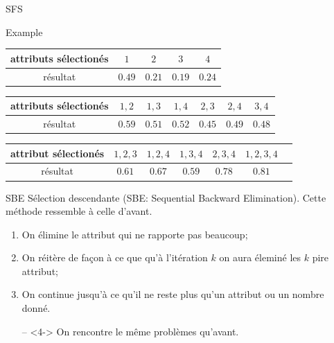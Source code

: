 \documentclass[9pt]{beamer}
\begin{document}
	\begin{frame}{SFS}
		\begin{block}{Example}
			\begin{longtable}{c c c c c}
				\toprule
				attributs sélectionés & $1$ & $2$ & $3$ & $4$\\
				\midrule
				résultat& $0.49$ & $0.21$ & $0.19$ &$0.24$\\
				\bottomrule
			\end{longtable}
			\begin{longtable}{c c c c c c c}
				\toprule
				attributs sélectionés & $1,2$ & $1,3$ & $1,4$ & $2,3$ & $2,4$ & $3,4$\\
				\midrule
				résultat & $0.59$ & $0.51$ & $0.52$ & $0.45$ & $0.49$ & $0.48$\\
				\bottomrule
			\end{longtable}
			\begin{longtable}{c c c c c c c}
				\toprule
				attribut sélectionés & $1,2,3$ & $1,2,4$ & $1,3,4$ & $2,3,4$ & $1,2,3,4$\\
				\midrule
				résultat & $0.61$ & $0.67$ & $0.59$ & $0.78$ & $0.81$\\
				\bottomrule
			\end{longtable}
		\end{block}
	\end{frame}

	\begin{frame}{SBE}
		Sélection descendante (SBE\@: Sequential Backward Elimination).
		Cette méthode ressemble à celle d'avant.
		\begin{enumerate}
		\item<1-> On élimine le attribut qui ne rapporte pas beaucoup;
		\item<2-> On réitère de façon à ce que qu'à l'itération $k$ on aura éleminé les $k$ pire attribut;
		\item<3-> On continue jusqu'à ce qu'il ne reste plus qu'un attribut ou un nombre donné.
		\item[--]<4-> On rencontre le même problèmes qu'avant.
		\end{enumerate}
	\end{frame}
\end{document}
